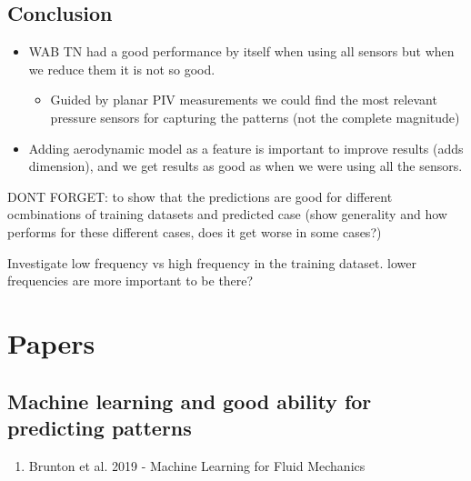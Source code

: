 \documentclass[%
 reprint,
 amsmath,amssymb,
 aps,
]{revtex4-2}
\begin{document}
\subsection{Conclusion}
\begin{itemize}
    \item WAB TN had a good performance by itself when using all sensors but when we reduce them it is not so good.
        \begin{itemize}
            \item Guided by planar PIV measurements we could find the most relevant pressure sensors for capturing the patterns (not the complete magnitude)
        \end{itemize}
    \item Adding aerodynamic model as a feature is important to improve results (adds dimension), and we get results as good as when we were using all the sensors.

\end{itemize}

DONT FORGET: to show that the predictions are good for different ocmbinations of training datasets and predicted case (show generality and how performs for these different cases, does it get worse in some cases?)

Investigate low frequency vs high frequency in the training dataset. lower frequencies are more important to be there?


\newpage


\section{Papers}

\subsection{Machine learning and good ability for predicting patterns}
\begin{enumerate}
    \item Brunton et al. 2019 - Machine Learning for Fluid Mechanics
\end{enumerate}
\end{document}
